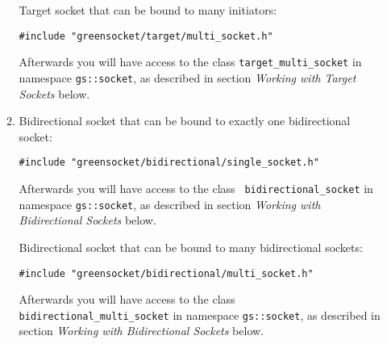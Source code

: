 \documentclass[a4paper,10pt]{article}          %
\begin{document}
\begin{enumerate}
\begin{enumerate}
Target socket that can be bound to many initiators:

\verb|#include "greensocket/target/multi_socket.h"|

Afterwards you will have access to the class \verb|target_multi_socket| in namespace \verb|gs::socket|, as described in section \emph{Working with Target Sockets} below.

\item 
Bidirectional socket that can be bound to exactly one bidirectional socket:

\verb|#include "greensocket/bidirectional/single_socket.h"|

Afterwards you will have access to the class \verb| bidirectional_socket| in namespace \verb|gs::socket|, as described in section \emph{Working with Bidirectional Sockets} below.

Bidirectional socket that can be bound to many bidirectional sockets:

\verb|#include "greensocket/bidirectional/multi_socket.h"|

Afterwards you will have access to the class \verb| bidirectional_multi_socket| in namespace \verb|gs::socket|, as described in section \emph{Working with Bidirectional Sockets} below.

\end{enumerate}









\end{enumerate}
\end{document}
